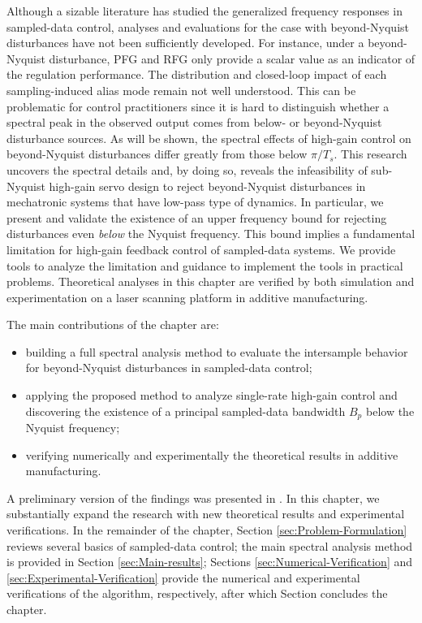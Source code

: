 \documentclass [11pt, proquest] {uwthesis}[2020/02/24]
\begin{document}
Although a sizable literature has studied the generalized frequency
responses in sampled-data control, analyses and evaluations for the
case with beyond-Nyquist disturbances have not been sufficiently developed.
For instance, under a beyond-Nyquist disturbance, PFG and RFG only
provide a scalar value as an indicator of the regulation performance.
The distribution and closed-loop impact of each sampling-induced
alias mode remain not well understood. This can be problematic for
control practitioners since it is hard to distinguish whether a spectral
peak in the observed output comes from below- or beyond-Nyquist disturbance
sources. As will be shown, the spectral effects of high-gain control
on beyond-Nyquist disturbances differ greatly from those below $\pi/T_{s}$.
This research uncovers the spectral details and, by doing so, reveals
the infeasibility of sub-Nyquist high-gain servo design to reject
beyond-Nyquist disturbances in mechatronic systems that have low-pass
type of dynamics. In particular, we present and validate the existence
of an upper frequency bound for rejecting disturbances even \emph{below}
the Nyquist frequency. This bound implies a fundamental limitation
for high-gain feedback control of sampled-data systems. We provide
tools to analyze the limitation and guidance to implement the tools
in practical problems. Theoretical analyses in this chapter are verified
by both simulation and experimentation on a laser scanning platform
in additive manufacturing.

The main contributions of the chapter are:
\begin{itemize}
\item building a full spectral analysis method to evaluate the intersample
behavior for beyond-Nyquist disturbances in sampled-data control;
\item applying the proposed method to analyze single-rate high-gain control
and discovering the existence of a principal sampled-data bandwidth
$B_{p}$ below the Nyquist frequency;
\item verifying numerically and experimentally the theoretical results in
additive manufacturing.
\end{itemize}
A preliminary version of the findings was presented in \cite{wang2016spectral}.
In this chapter, we substantially expand the research with new theoretical
results and experimental verifications. In the remainder of the chapter,
Section \ref{sec:Problem-Formulation} reviews several basics of sampled-data
control; the main spectral analysis method is provided in Section
\ref{sec:Main-results}; Sections \ref{sec:Numerical-Verification}
and \ref{sec:Experimental-Verification} provide the numerical and
experimental verifications of the algorithm, respectively, after which
Section concludes the chapter. 
\end{document}
